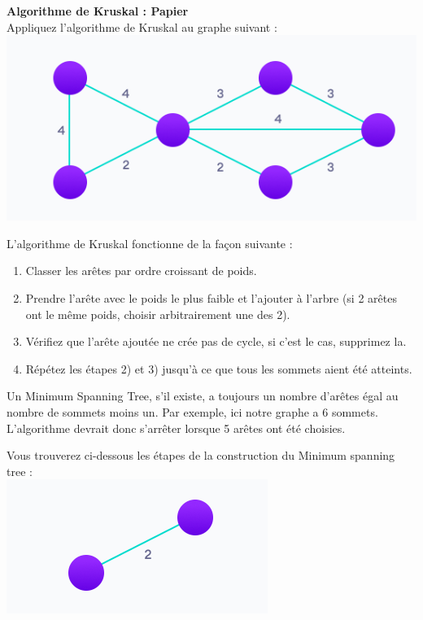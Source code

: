 \begin{Exercice}[5 minutes] \textbf{Algorithme de Kruskal : Papier}\\
    Appliquez l'algorithme de Kruskal au graphe suivant :\\
    \includegraphics[]{resources/Kruskal.PNG}
    \begin{conseil}
        L'algorithme de Kruskal fonctionne de la façon suivante :
        \begin{enumerate}
            \item Classer les arêtes par ordre croissant de poids.
            \item Prendre l'arête avec le poids le plus faible et l'ajouter à l'arbre (si 2 arêtes ont le même poids, choisir arbitrairement une des 2).
            \item Vérifiez que l'arête ajoutée ne crée pas de cycle, si c'est le cas, supprimez la.
            \item Répétez les étapes 2) et 3) jusqu'à ce que tous les sommets aient été atteints.
        \end{enumerate}
        Un Minimum Spanning Tree, s'il existe, a toujours un nombre d'arêtes égal au nombre de sommets moins un. Par exemple, ici notre graphe a 6 sommets. L'algorithme devrait donc s'arrêter lorsque 5 arêtes ont été choisies.
    \end{conseil}
    \begin{solution}
        Vous trouverez ci-dessous les étapes de la construction du Minimum spanning tree :\\
        \includegraphics[]{resources/K1.PNG}\\

\end{solution}
\end{Exercice}
